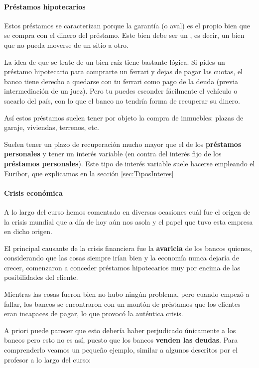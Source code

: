 \documentclass[nochap,palatino,shortheader]{apuntes}
\newcommand{\study}[1]{#1} \newcommand{\substudy}[1]{#1}
\begin{document}
\paragraph{Préstamos hipotecarios\\}
Estos préstamos se caracterizan porque la garantía (o \study{aval}) es \substudy{el propio bien que se compra} con el dinero del préstamo. Este bien \study{debe ser} un , es decir, \substudy{un bien que no pueda moverse de un sitio a otro}.

La idea de que se trate de un bien raíz tiene bastante lógica. Si pides un préstamo hipotecario para comprarte un ferrari y dejas de pagar las cuotas, el banco tiene derecho a quedarse con tu ferrari como pago de la deuda (previa intermediación de un juez). Pero tu puedes esconder fácilmente el vehículo o sacarlo del país, con lo que el banco no tendría forma de recuperar su dinero.

Así estos préstamos \substudy{suelen} tener por objeto la compra de \substudy{inmuebles}: plazas de garaje, viviendas, terrenos, etc.

Suelen tener un \substudy{plazo de recuperación} mucho \substudy{mayor} que el de los \textbf{préstamos personales} \substudy{y} tener un \substudy{interés variable} (en contra del interés fijo de los \textbf{préstamos personales}). Este tipo de interés variable suele hacerse empleando el Euribor, que explicamos en la sección \ref{sec:TiposInteres}

\paragraph{Crisis económica}
A lo largo del curso hemos comentado en diversas ocasiones cuál fue el origen de la crisis mundial que a día de hoy aún nos asola y el papel que tuvo esta empresa en dicho origen.

El principal causante de la crisis financiera fue la \textbf{avaricia} de los bancos quienes, considerando que las cosas siempre irían bien y la economía nunca dejaría de crecer, comenzaron a conceder préstamos hipotecarios muy por encima de las posibilidades del cliente.

Mientras las cosas fueron bien no hubo ningún problema, pero cuando empezó a fallar, los bancos se encontraron con un montón de préstamos que los clientes eran incapaces de pagar, lo que provocó la auténtica crisis.

A priori puede parecer que esto debería haber perjudicado únicamente a los bancos pero esto no es así, puesto que los bancos \textbf{venden las deudas}. Para comprenderlo veamos un pequeño ejemplo, similar a algunos descritos por el profesor a lo largo del curso:
\end{document}
